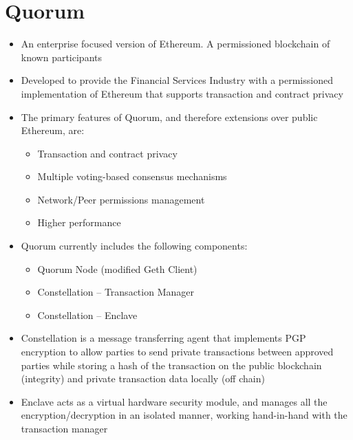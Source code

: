 \section{Quorum}
\begin{itemize}
	\item An enterprise focused version of Ethereum. A permissioned blockchain of known participants
	\item Developed to provide the Financial Services Industry with a permissioned implementation of Ethereum that supports transaction and contract privacy
	\item The primary features of Quorum, and therefore extensions over public Ethereum, are:
	\begin{itemize}
		\item Transaction and contract privacy
		\item Multiple voting-based consensus mechanisms
		\item Network/Peer permissions management
		\item Higher performance
	\end{itemize}
	\item Quorum currently includes the following components:
	\begin{itemize}
		\item Quorum Node (modified Geth Client)
		\item Constellation -- Transaction Manager
		\item Constellation -- Enclave
	\end{itemize}
	\item Constellation is a message transferring agent that implements PGP encryption to allow parties to send private transactions between approved parties while storing a hash of the transaction on the public blockchain (integrity) and private transaction data locally (off chain)
	\item Enclave acts as a virtual hardware security module, and manages all the encryption/decryption in an isolated manner, working hand-in-hand with the transaction manager
\end{itemize}